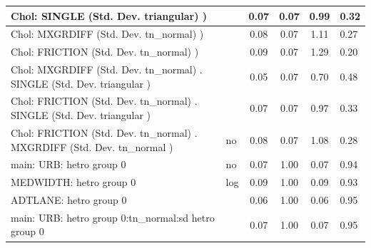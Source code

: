 \begin{table}
\begin{center}
\begin{tabular}{|l|l|c|c|c|l|}
			\hline
			 Chol: SINGLE (Std. Dev. triangular) ) &  & 0.07 & 0.07 & 0.99 & 0.32 \\
			\hline
			 Chol: MXGRDIFF (Std. Dev. tn_normal) ) &  & 0.08 & 0.07 & 1.11 & 0.27 \\
			\hline
			 Chol: FRICTION (Std. Dev. tn_normal) ) &  & 0.09 & 0.07 & 1.29 & 0.20 \\
			\hline
			 Chol: MXGRDIFF (Std. Dev. tn_normal) . SINGLE (Std. Dev.   triangular ) &  & 0.05 & 0.07 & 0.70 & 0.48 \\
			\hline
			 Chol: FRICTION (Std. Dev. tn_normal) . SINGLE (Std. Dev.   triangular ) &  & 0.07 & 0.07 & 0.97 & 0.33 \\
			\hline
			 Chol: FRICTION (Std. Dev. tn_normal) . MXGRDIFF (Std. Dev.   tn_normal ) & no & 0.08 & 0.07 & 1.08 & 0.28 \\
			\hline
			main: URB: hetro group 0 & no & 0.07 & 1.00 & 0.07 & 0.94 \\
			\hline
			MEDWIDTH: hetro group 0 & log & 0.09 & 1.00 & 0.09 & 0.93 \\
			\hline
			ADTLANE: hetro group 0 &  & 0.06 & 1.00 & 0.06 & 0.95 \\
			\hline
			main: URB: hetro group 0:tn_normal:sd  hetro group 0 &  & 0.07 & 1.00 & 0.07 & 0.95 \\
			\hline
		\end{tabular}
	\end{center}
\end{table}
